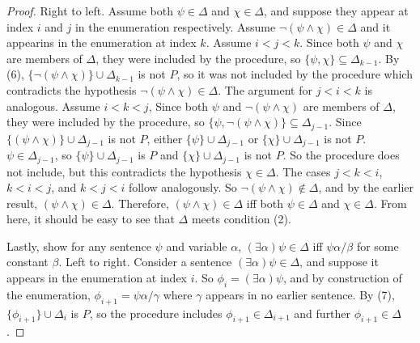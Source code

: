 \documentclass[12pt]{article}
\theoremstyle{definition}
\theoremstyle{remark}
\begin{document}
\begin{proof}
	Right to left. Assume both $\psi \in \Delta$ and $\chi \in \Delta$, and suppose they appear at index $i$ and $j$ in the enumeration respectively. Assume $\neg(\psi \land \chi) \in \Delta$ and it appearins in the enumeration at index $k$. Assume $i < j < k$. Since both $\psi$ and $\chi$ are members of $\Delta$, they were included by the procedure, so $\{ \psi, \chi \} \subseteq \Delta_{k-1}$. By (6), $\{ \neg(\psi \land \chi) \} \cup \Delta_{k-1}$ is not $P$, so it was not included by the procedure which contradicts the hypothesis $\neg(\psi \land \chi) \in \Delta$. The argument for $j < i < k$ is analogous. Assume $i < k < j$, Since both $\psi$ and $\neg(\psi \land \chi)$ are members of $\Delta$, they were included by the procedure, so $\{ \psi, \neg(\psi \land \chi) \} \subseteq \Delta_{j-1}$. Since $\{ (\psi \land \chi) \} \cup \Delta_{j-1}$ is not $P$, either $\{ \psi \} \cup \Delta_{j-1}$ or $\{ \chi \} \cup \Delta_{j-1}$ is not $P$. $\psi \in \Delta_{j-1}$, so $\{ \psi \} \cup \Delta_{j-1}$ is $P$ and $\{ \chi \} \cup \Delta_{j-1}$ is not $P$. So the procedure does not include, but this contradicts the hypothesis $\chi \in \Delta$. The cases $j < k < i$, $k < i < j$, and $k < j < i$ follow analogously. So $\neg(\psi \land \chi) \not\in \Delta$, and by the earlier result, $(\psi \land \chi) \in \Delta$. Therefore, $(\psi \land \chi) \in \Delta$ iff both $\psi \in \Delta$ and $\chi \in \Delta$. From here, it should be easy to see that $\Delta$ meets condition (2).
	
	Lastly, show for any sentence $\psi$ and variable $\alpha$, $(\exists \alpha)\psi \in \Delta$ iff $\psi\alpha/\beta$ for some constant $\beta$. Left to right. Consider a sentence $(\exists \alpha)\psi \in \Delta$, and suppose it appears in the enumeration at index $i$. So $\phi_i = (\exists \alpha)\psi$, and by construction of the enumeration, $\phi_{i+1} = \psi\alpha/\gamma$ where $\gamma$ appears in no earlier sentence. By (7), $\{ \phi_{i+1} \} \cup \Delta_i$ is $P$, so the procedure includes $\phi_{i+1} \in \Delta_{i+1}$ and further $\phi_{i+1}\in \Delta$. 
	

\end{proof}
\end{document}
